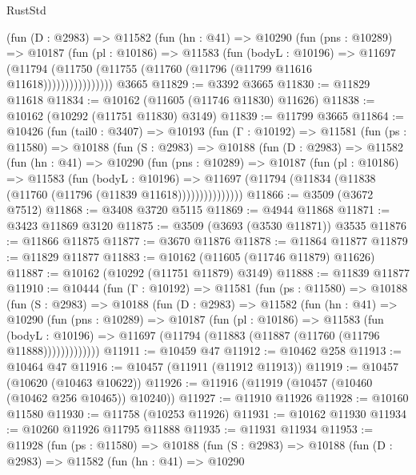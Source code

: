 \begin{lexlean}{RustStd}
\begin{coremodule}
              (fun (D : @2983) =>
              @11582
                (fun (hn : @41) =>
                @10290
                  (fun (pns : @10289) =>
                  @10187
                    (fun (pl : @10186) =>
                    @11583
                      (fun (bodyL : @10196) =>
                      @11697
                        (@11794
                          (@11750 (@11755 (@11760 (@11796 (@11799 @11616 @11618))))))))))))))))
    @3665
@11829 := @3392 @3665
@11830 := @11829 @11618
@11834 := @10162 (@11605 (@11746 @11830) @11626)
@11838 := @10162 (@10292 (@11751 @11830) @3149)
@11839 := @11799 @3665
@11864 := @10426
    (fun (tail0 : @3407) =>
    @10193
      (fun (Γ : @10192) =>
      @11581
        (fun (ps : @11580) =>
        @10188
          (fun (S : @2983) =>
          @10188
            (fun (D : @2983) =>
            @11582
              (fun (hn : @41) =>
              @10290
                (fun (pns : @10289) =>
                @10187
                  (fun (pl : @10186) =>
                  @11583
                    (fun (bodyL : @10196) =>
                    @11697 (@11794 (@11834 (@11838 (@11760 (@11796 (@11839 @11618)))))))))))))))
@11866 := @3509 (@3672 @7512)
@11868 := @3408 @3720 @5115
@11869 := @4944 @11868
@11871 := @3423 @11869 @3120
@11875 := @3509 (@3693 (@3530 @11871)) @3535
@11876 := @11866 @11875
@11877 := @3670 @11876
@11878 := @11864 @11877
@11879 := @11829 @11877
@11883 := @10162 (@11605 (@11746 @11879) @11626)
@11887 := @10162 (@10292 (@11751 @11879) @3149)
@11888 := @11839 @11877
@11910 := @10444
    (fun (Γ : @10192) =>
    @11581
      (fun (ps : @11580) =>
      @10188
        (fun (S : @2983) =>
        @10188
          (fun (D : @2983) =>
          @11582
            (fun (hn : @41) =>
            @10290
              (fun (pns : @10289) =>
              @10187
                (fun (pl : @10186) =>
                @11583
                  (fun (bodyL : @10196) =>
                  @11697 (@11794 (@11883 (@11887 (@11760 (@11796 @11888)))))))))))))
@11911 := @10459 @47
@11912 := @10462 @258
@11913 := @10464 @47
@11916 := @10457 (@11911 (@11912 @11913))
@11919 := @10457 (@10620 (@10463 @10622))
@11926 := @11916 (@11919 (@10457 (@10460 (@10462 @256 @10465)) @10240))
@11927 := @11910 @11926
@11928 := @10160 @11580
@11930 := @11758 (@10253 @11926)
@11931 := @10162 @11930
@11934 := @10260 @11926 @11795 @11888
@11935 := @11931 @11934
@11953 := @11928
    (fun (ps : @11580) =>
    @10188
      (fun (S : @2983) =>
      @10188
        (fun (D : @2983) =>
        @11582
          (fun (hn : @41) =>
          @10290

\end{coremodule}
\end{lexlean}
